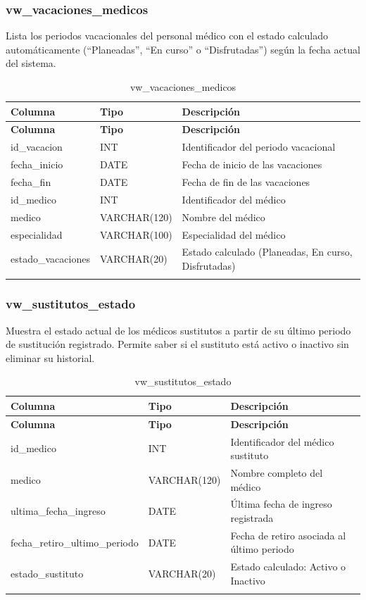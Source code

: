 \documentclass[12pt,a4paper]{article}
\begin{document}
\subsubsection{vw\_vacaciones\_medicos}
Lista los periodos vacacionales del personal m\'edico con el estado calculado autom\'aticamente (``Planeadas'', ``En curso'' o ``Disfrutadas'') seg\'un la fecha actual del sistema.

{\small\begin{longtable}{|p{2.3cm}|p{3.3cm}|p{8cm}|}
\hline
\textbf{Columna} & \textbf{Tipo} & \textbf{Descripci\'on} \\ \hline
\endfirsthead
\hline
\textbf{Columna} & \textbf{Tipo} & \textbf{Descripci\'on} \\ \hline
\endhead
id\_vacacion & INT & Identificador del periodo vacacional \\ \hline
fecha\_inicio & DATE & Fecha de inicio de las vacaciones \\ \hline
fecha\_fin & DATE & Fecha de fin de las vacaciones \\ \hline
id\_medico & INT & Identificador del m\'edico \\ \hline
medico & VARCHAR(120) & Nombre del m\'edico \\ \hline
especialidad & VARCHAR(100) & Especialidad del m\'edico \\ \hline
estado\_vacaciones & VARCHAR(20) & Estado calculado (Planeadas, En curso, Disfrutadas) \\ \hline
\caption{vw\_vacaciones\_medicos}
\end{longtable}}

\subsubsection{vw\_sustitutos\_estado}
Muestra el estado actual de los m\'edicos sustitutos a partir de su \'ultimo periodo de sustituci\'on registrado. Permite saber si el sustituto est\'a activo o inactivo sin eliminar su historial.

{\small\begin{longtable}{|p{2.3cm}|p{3.3cm}|p{8cm}|}
\hline
\textbf{Columna} & \textbf{Tipo} & \textbf{Descripci\'on} \\ \hline
\endfirsthead
\hline
\textbf{Columna} & \textbf{Tipo} & \textbf{Descripci\'on} \\ \hline
\endhead
id\_medico & INT & Identificador del m\'edico sustituto \\ \hline
medico & VARCHAR(120) & Nombre completo del m\'edico \\ \hline
ultima\_fecha\_ingreso & DATE & \'Ultima fecha de ingreso registrada \\ \hline
fecha\_retiro\_ultimo\_periodo & DATE & Fecha de retiro asociada al \'ultimo periodo \\ \hline
estado\_sustituto & VARCHAR(20) & Estado calculado: Activo o Inactivo \\ \hline
\caption{vw\_sustitutos\_estado}
\end{longtable}}
\end{document}
